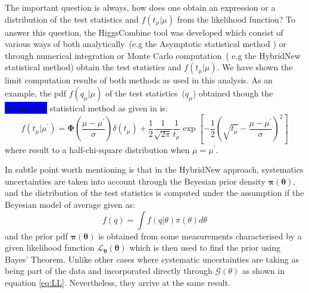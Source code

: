 The important question is always, how does one obtain an expression or a distribution of the test statistics and $f(t_{\mu}|\mu)$ from the likelihood function? To answer this question, the HiggsCombine tool was developed which consist of various ways of both analytically~(e.g the Asymptotic statistical method \cite{ASYMP}) or through numerical integration or Monte Carlo computation~( e.g the HybridNew statistical method) obtain the test statistics and $ f(t_{\mu}|\mu)$. We have shown the limit computation results of both methods as used in this analysis.
As an example, the pdf $ f(q_{\mu}|\mu)$ of the test statistics~($q_{\mu}$) obtained though the \colorbox{blue}{Asymptotic} statistical method as given in \cite{ASYMP} is:
\begin{equation}\label{eq:ASYPTOTIC}
f(t_{\mu}|{\mu}^{\prime}) = \mathbf{\Phi}\left( \frac{\mu -{\mu}^{\prime}}{\sigma}\right)\delta(t_{\mu}) +
                             \frac{1}{2}\frac{1}{\sqrt{2\pi}}\frac{1}{t_{\mu}}\exp\left[-\frac{1}{2} \left(  \sqrt{t_{\mu}} - \frac{\mu - {\mu}^{\prime}}{\sigma}\right)^{2} \right]
\end{equation}
where result to a half-chi-square distribution when $\mu = \mu^{\prime}$.

In subtle point worth mentioning is that in the HybridNew approach, systematics uncertainties are taken into account through the Beyesian prior density $\mathbf{\pi(\theta)}$, and the distribution of the test statistics is computed under the assumption if the Beyesian model of average given as: $$\displaystyle{f(q) = \int f(q|\theta)\pi(\theta)d\theta}$$ and the prior pdf $\mathbf{\pi(\theta)}$ is obtained from some measurements characterised by a given likelihood function $\mathcal{L}_{\mathbf{\theta}}(\mathbf{\theta} )$ which is then used to find the prior using Bayes' Theorem. Unlike other cases where systematic uncertainties are taking as being part of the data and incorporated directly through $\mathcal{G}(\theta)$ as shown in equation \ref{eq:LL}. Nevertheless, they arrive at the same result.


